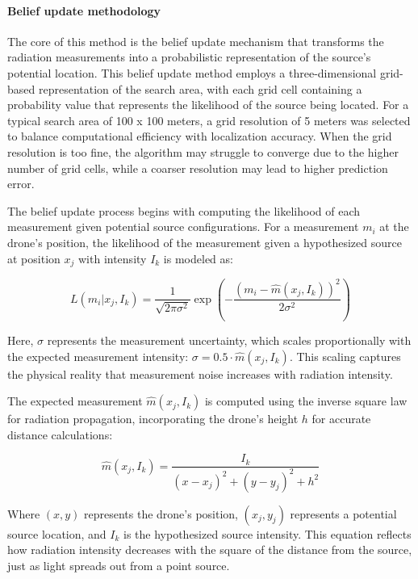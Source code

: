 \documentclass[../report.tex]{subfiles}
\begin{document}
    \paragraph{Belief update methodology}
    The core of this method is the belief update mechanism that transforms the radiation measurements into a probabilistic representation of the source's potential location. This belief update 
    method employs a three-dimensional grid-based representation of the search area, with each grid cell containing a probability value that represents the likelihood of the source being located.
    For a typical search area of 100 x 100 meters, a grid resolution of 5 meters was selected to balance computational efficiency with localization accuracy. When the grid 
    resolution is too fine, the algorithm may struggle to converge due to the higher number of grid cells, while a coarser resolution may lead to higher prediction error.

    The belief update process begins with computing the likelihood of each measurement given potential source configurations. For a measurement $m_i$ at the drone's position, the likelihood of 
    the measurement given a hypothesized source at position $x_j$ with intensity $I_k$ is modeled as:

    \begin{equation}
        L(m_i | x_j, I_k) = \frac{1}{\sqrt{2\pi\sigma^2}} \exp\left(-\frac{(m_i - \hat{m}(x_j, I_k))^2}{2\sigma^2}\right)
        \label{eq:rollout_likelihood}
    \end{equation}

    Here, $\sigma$ represents the measurement uncertainty, which scales proportionally with the expected measurement intensity: $\sigma = 0.5 \cdot \hat{m}(x_j, I_k)$. This scaling captures the physical reality that measurement noise increases with radiation intensity.

    The expected measurement $\hat{m}(x_j, I_k)$ is computed using the inverse square law for radiation propagation, incorporating the drone's height $h$ for accurate distance calculations:

    \begin{equation}
        \hat{m}(x_j, I_k) = \frac{I_k}{(x - x_j)^2 + (y - y_j)^2 + h^2}
    \end{equation}

    Where $(x,y)$ represents the drone's position, $(x_j,y_j)$ represents a potential source location, and $I_k$ is the hypothesized source intensity. This equation reflects how 
    radiation intensity decreases with the square of the distance from the source, just as light spreads out from a point source.
    
\end{document}
